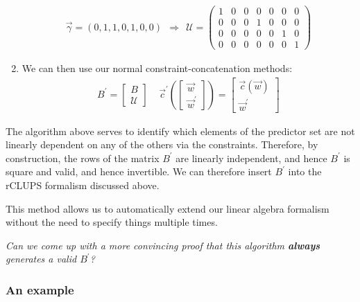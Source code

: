 \documentclass[]{article}
\begin{document}
\begin{enumerate}
					\begin{align*}
						\vec{\gamma} = (0,1,1,0,1,0,0) ~~\Longrightarrow~~ \mathcal{U} = \begin{pmatrix}
							1 & 0 & 0 & 0 & 0 & 0 & 0
							\\
							0 & 0 & 0 & 1 & 0 & 0 & 0
							\\
							0 & 0 & 0 & 0 & 0 & 1 & 0
							\\
							0 & 0 & 0 & 0 & 0 & 0 & 1
						\end{pmatrix}
					\end{align*} 
					\item We can then use our normal constraint-concatenation methods: 
					\begin{align*}
						B^\prime = \begin{bmatrix}  B \\ \mathcal{U} \end{bmatrix} ~~~~~ \vec{c}^\prime \left(\begin{bmatrix}	 \vec{w} \\ \vec{w}^\prime 
						\end{bmatrix}\right) = \begin{bmatrix}	 \vec{c}(\vec{w}) \\ \vec{w}^\prime 
						\end{bmatrix}
					\end{align*}
				\end{enumerate}
				The algorithm above serves to identify which elements of the predictor set are not linearly dependent on any of the others via the constraints. Therefore, by construction, the rows of the matrix $B^\prime$ are linearly independent, and hence $B^\prime$ is square and valid, and hence invertible. We can therefore insert $B^\prime$ into the rCLUPS formalism discussed above. 
				
				This method allows us to automatically extend our linear algebra formalism without the need to specify things multiple times. 

				
				{\it Can we come up with a more convincing proof that this algorithm \textbf{always} generates a valid $B^\prime$?}
				\subsubsection{An example}
\end{document}
